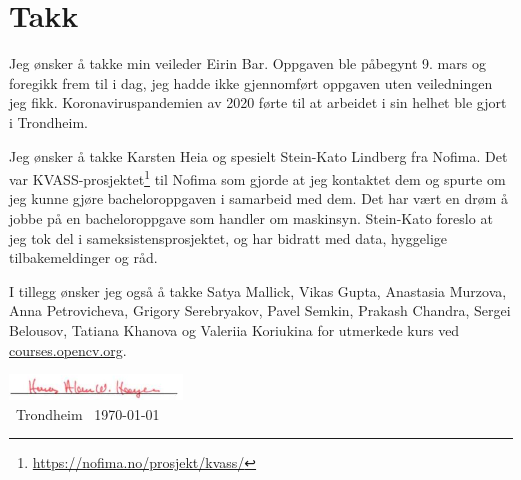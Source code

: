 \section*{Takk}

Jeg ønsker å takke min veileder Eirin Bar. Oppgaven ble påbegynt 9. mars og foregikk frem til i dag, jeg hadde ikke gjennomført oppgaven uten veiledningen jeg fikk. Koronaviruspandemien av 2020 førte til at arbeidet i sin helhet ble gjort i Trondheim.

Jeg ønsker å takke Karsten Heia og spesielt Stein-Kato Lindberg fra Nofima. Det var KVASS-prosjektet\footnote{\url{https://nofima.no/prosjekt/kvass/}} til Nofima som gjorde at jeg kontaktet dem og spurte om jeg kunne gjøre bacheloroppgaven i samarbeid med dem. Det har vært en drøm å jobbe på en bacheloroppgave som handler om maskinsyn. Stein-Kato foreslo at jeg tok del i sameksistensprosjektet, og har bidratt med data, hyggelige tilbakemeldinger og råd.

I tillegg ønsker jeg også å takke Satya Mallick, Vikas Gupta, Anastasia Murzova, Anna Petrovicheva, Grigory Serebryakov, Pavel Semkin, Prakash Chandra, Sergei Belousov, Tatiana Khanova og Valeriia Koriukina for utmerkede kurs ved \url{courses.opencv.org}.

\begin{flushright} 
\includegraphics{figures/underskrift}\\ \ Trondheim \ \today
\end{flushright} 


